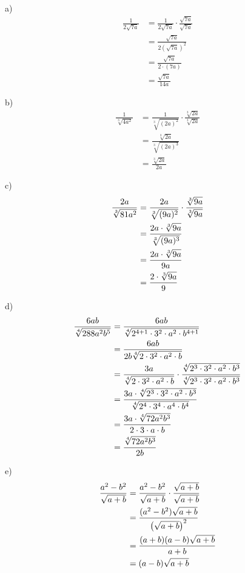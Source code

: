 \begin{solucio}
a)%
\begin{align*}
\frac{1}{2\sqrt{7a}} &=\frac{1}{2\sqrt{7a}}\cdot \frac{\sqrt{7a}}{\sqrt{7a}}
\\
&=\frac{\sqrt{7a}}{2\left( \sqrt{7a}\right) ^{2}} \\
&=\frac{\sqrt{7a}}{2\cdot \left( 7a\right) } \\
&=\frac{\sqrt{7a}}{14a}
\end{align*}

b)%
\begin{align*}
\frac{1}{\sqrt[3]{4a^{2}}} &=\frac{1}{\sqrt[3]{\left( 2a\right) ^{2}}}\cdot 
\frac{\sqrt[3]{2a}}{\sqrt[3]{2a}} \\
&=\frac{\sqrt[3]{2a}}{\sqrt[3]{(2a)^{3}}} \\
&=\frac{\sqrt[3]{2a}}{2a}
\end{align*}

c)%
\begin{align*}
\frac{2a}{\sqrt[3]{81a^{2}}} &=\frac{2a}{\sqrt[3]{(9a)^{2}}}\cdot \frac{%
\sqrt[3]{9a}}{\sqrt[3]{9a}} \\
&=\frac{2a\cdot \sqrt[3]{9a}}{\sqrt[3]{(9a)^{3}}} \\
&=\frac{2a\cdot \sqrt[3]{9a}}{9a} \\
&=\frac{2\cdot \sqrt[3]{9a}}{9}
\end{align*}

d)%
\begin{align*}
\frac{6ab}{\sqrt[4]{288a^{2}b^{5}}} &=\frac{6ab}{\sqrt[4]{2^{4+1}\cdot
3^{2}\cdot a^{2}\cdot b^{4+1}}} \\
&=\frac{6ab}{2b\sqrt[4]{2\cdot 3^{2}\cdot a^{2}\cdot b}} \\
&=\frac{3a}{\sqrt[4]{2\cdot 3^{2}\cdot a^{2}\cdot b}}\cdot \frac{\sqrt[4]{%
2^{3}\cdot 3^{2}\cdot a^{2}\cdot b^{3}}}{\sqrt[4]{2^{3}\cdot 3^{2}\cdot
a^{2}\cdot b^{3}}} \\
&=\frac{3a\cdot \sqrt[4]{2^{3}\cdot 3^{2}\cdot a^{2}\cdot b^{3}}}{\sqrt[4]{%
2^{4}\cdot 3^{4}\cdot a^{4}\cdot b^{4}}} \\
&=\frac{3a\cdot \sqrt[4]{72a^{2}b^{3}}}{2\cdot 3\cdot a\cdot b} \\
&=\frac{\sqrt[4]{72a^{2}b^{3}}}{2b}
\end{align*}

e)%
\begin{align*}
\frac{a^{2}-b^{2}}{\sqrt{a+b}} &=\frac{a^{2}-b^{2}}{\sqrt{a+b}}\cdot \frac{%
\sqrt{a+b}}{\sqrt{a+b}} \\
&=\frac{(a^{2}-b^{2})\sqrt{a+b}}{\left( \sqrt{a+b}\right) ^{2}} \\
&=\frac{(a+b)(a-b)\sqrt{a+b}}{a+b} \\
&=(a-b)\sqrt{a+b}
\end{align*}
\end{solucio}

